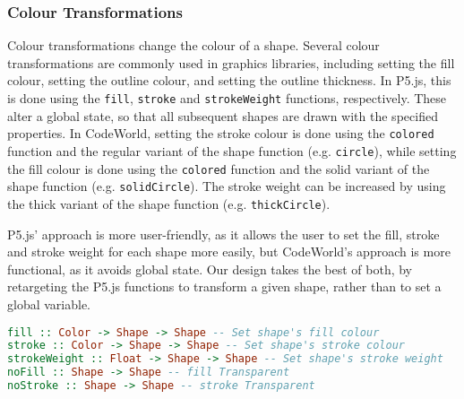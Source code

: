 \documentclass[../main.tex]{subfiles}
\begin{document}
            \subsubsection{Colour Transformations}
                Colour transformations change the colour of a shape.
                Several colour transformations are commonly used in graphics libraries,
                    including setting the fill colour, setting the outline colour, and setting the
                    outline thickness.
                In P5.js, this is done using the \texttt{fill}, \texttt{stroke} and
                    \texttt{strokeWeight} functions, respectively.
                These alter a global state, so that all subsequent shapes are drawn with the
                    specified properties.
                In CodeWorld, setting the stroke colour is done using the \texttt{colored}
                    function and the regular variant of the shape function (e.g. \texttt{circle}),
                    while setting the fill colour is done using the \texttt{colored} function and
                    the solid variant of the shape function (e.g. \texttt{solidCircle}).
                The stroke weight can be increased by using the thick variant of the shape
                    function (e.g. \texttt{thickCircle}).

                P5.js' approach is more user-friendly, as it allows the user to set the fill,
                    stroke and stroke weight for each shape more easily, but CodeWorld's approach
                    is more functional, as it avoids global state.
                Our design takes the best of both, by retargeting the P5.js functions to
                    transform a given shape, rather than to set a global variable.

                \begin{lstlisting}[language={Haskell}, label={lst:colour}, caption={The colour 
                    transformation functions.}]
fill :: Color -> Shape -> Shape -- Set shape's fill colour
stroke :: Color -> Shape -> Shape -- Set shape's stroke colour
strokeWeight :: Float -> Shape -> Shape -- Set shape's stroke weight
noFill :: Shape -> Shape -- fill Transparent
noStroke :: Shape -> Shape -- stroke Transparent\end{lstlisting}
\end{document}
